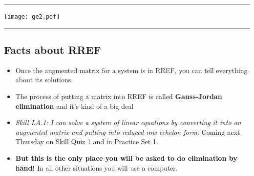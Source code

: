 \documentclass[
  letterpaper,
  DIV=11,
  numbers=noendperiod]{scrartcl}
\providecommand{\tightlist}{%
  \setlength{\itemsep}{0pt}\setlength{\parskip}{0pt}}\usepackage{longtable,booktabs,array}
\begin{document}
\begin{center}\rule{0.5\linewidth}{0.5pt}\end{center}

\texttt{[image: ge2.pdf]}

\begin{center}\rule{0.5\linewidth}{0.5pt}\end{center}

\hypertarget{facts-about-rref}{%
\subsection{Facts about RREF}\label{facts-about-rref}}

\begin{itemize}
\tightlist
\item
  Once the augmented matrix for a system is in RREF, you can tell
  everything about its solutions.
\item
  The process of putting a matrix into RREF is called
  \textbf{Gauss-Jordan elimination} and it's kind of a big deal
\item
  \emph{Skill LA.1: I can solve a system of linear equations by
  converting it into an augmented matrix and putting into reduced row
  echelon form}. Coming next Thursday on Skill Quiz 1 and in Practice
  Set 1.
\item
  \textbf{But this is the only place you will be asked to do elimination
  by hand!} In all other situations you will use a computer.
\end{itemize}
\end{document}
